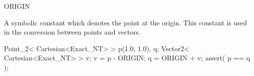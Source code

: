 \begin{ccRefConstant}{ORIGIN}


\ccDefinition
A symbolic constant which denotes the point at the origin.
This constant is used in the conversion between points and vectors.

\ccExample

\begin{cprog}
  Point_2< Cartesian<Exact_NT> >  p(1.0, 1.0), q;
  Vector2< Cartesian<Exact_NT> >  v;
  v = p - ORIGIN;
  q = ORIGIN + v;  
  assert( p == q );
\end{cprog} 

\ccSeeAlso
{} \\
 \\

\end{ccRefConstant}
